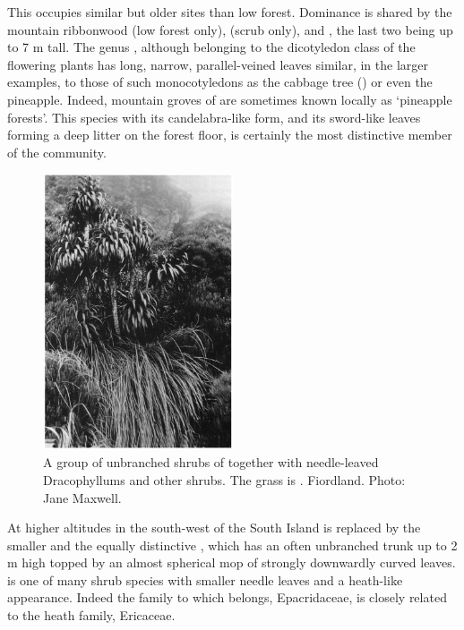 This occupies similar but older sites than  low forest.
Dominance is shared by the mountain ribbonwood (low forest only),  (scrub only),  and , the last two being up to 7 m tall.
The genus , although belonging to the dicotyledon class of the flowering plants has long, narrow, parallel-veined leaves similar, in the larger examples, to those of such monocotyledons as the cabbage tree () or even the pineapple.
Indeed, mountain groves of  are sometimes known locally as `pineapple forests'.
This species with its candelabra-like form, and its sword-like leaves forming a deep litter on the forest floor, is certainly the most distinctive member of the community.

\begin{figure}
	\includegraphics[width=0.5\textwidth]{graphics/figure92dracophyllum.jpg}
	\centering
	\caption[A group of unbranched shrubs of Dracophyllum fiordense]{A group of unbranched shrubs of  together with needle-leaved Dracophyllums and other shrubs.
	The grass is .
	Fiordland.
	Photo: Jane Maxwell.}%
	\label{fig:92dracophyllum}
\end{figure}

At higher altitudes in the south-west of the South Island  is replaced by the smaller  and the equally distinctive , which has an often unbranched trunk up to 2 m high topped by an almost spherical mop of strongly downwardly curved leaves.  is one of many shrub species with smaller needle leaves and a heath-like appearance.
Indeed the family to which  belongs, Epacridaceae, is closely related to the heath family, Ericaceae.


